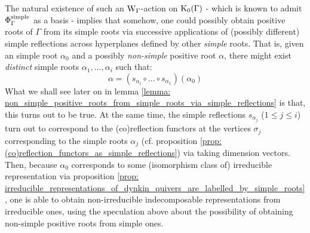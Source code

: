 \begin{remark}
                The natural existence of such an $\mathrm{W}_{\Gamma}$-action on $\mathrm{K}_0(\Gamma)$ - which is known to admit $\Phi_{\Gamma}^{\mathrm{simple}}$ as a basis - implies that somehow, one could possibly obtain positive roots of $\Gamma$ from its simple roots via successive applications of (possibly different) simple reflections across hyperplanes defined by other \textit{simple} roots. That is, given an  simple root $\alpha_0$ and a possibly \textit{non-simple} positive root $\alpha$, there might exist \textit{distinct} simple roots $\alpha_1, ..., \alpha_i$ such that:
                    $$\alpha = (s_{\alpha_i} \circ ... \circ s_{\alpha_1})(\alpha_0)$$
                What we shall see later on in lemma \ref{lemma: non_simple_positive_roots_from_simple_roots_via_simple_reflections} is that, this turns out to be true. At the same time, the simple reflections $s_{\alpha_j}$ ($1 \leq j \leq i$) turn out to correspond to the (co)reflection functors at the vertices $\sigma_j$ corresponding to the simple roots $\alpha_j$ (cf. proposition \ref{prop: (co)reflection_functors_as_simple_reflections}) via taking dimension vectors. Then, because $\alpha_0$ corresponds to some (isomorphism class of) irreducible representation via proposition \ref{prop: irreducible_representations_of_dynkin_quivers_are_labelled_by_simple_roots}, one is able to obtain non-irreducible indecomposable representations from irreducible ones, using the speculation above about the possibility of obtaining non-simple positive roots from simple ones.
            \end{remark}
            

